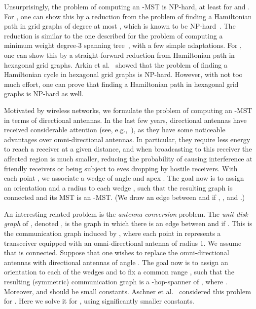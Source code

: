 \documentclass[11pt]{article}
\begin{document}
Unsurprisingly, the problem of computing an -MST is NP-hard, at least for  and . 
For , one can show this by a reduction from the problem of finding a Hamiltonian path in grid graphs of degree at most , which is known to be NP-hard~\cite{IPS82}. The reduction is similar to the one described for the problem of computing a minimum weight degree-3 spanning tree~\cite{PV84}, with a few simple adaptations. 
For , one can show this by a straight-forward reduction from Hamiltonian path in hexagonal grid graphs. Arkin et al.~\cite{AFIMMRPRX09} showed that the problem of finding a Hamiltonian cycle in hexagonal grid graphs is NP-hard. However, with not too much effort, one can prove that finding a Hamiltonian path in hexagonal grid graphs is NP-hard as well. 

Motivated by wireless networks, we formulate the problem of computing an -MST in terms of directional antennas. 
In the last few years, directional antennas have received considerable attention (see, e.g.,~\cite{KKM,BCDFKM11,CKKKW08}), as they have some noticeable advantages over omni-directional antennas. In particular, they require less energy to reach a receiver at a given distance, and
when broadcasting to this receiver the affected region is much smaller, reducing the probability of causing interference at friendly receivers or being subject to eves dropping by hostile receivers.
With each point , we associate a wedge  of angle  and apex . The goal now is to assign an orientation and a radius  to each wedge , such that the resulting graph is connected and its MST is an -MST. (We draw an edge between  and  if , , and .) 

An interesting related problem is the {\em antenna conversion} problem. The {\em unit disk graph} of , denoted , is the graph in which there is an edge between  and  if . This is the communication graph induced by , where each point in  represents a transceiver equipped with an omni-directional antenna of radius 1. We assume that  is connected. Suppose that one wishes to replace the omni-directional antennas with directional antennas of angle . The goal now is to assign an orientation to each of the wedges  and to fix a common range , such that the resulting (symmetric) communication graph is a -hop-spanner of , where . Moreover,  and  should be small constants.
Aschner et al.~\cite{AKM13} considered this problem for . Here we solve it for , using significantly smaller constants. 
\end{document}
